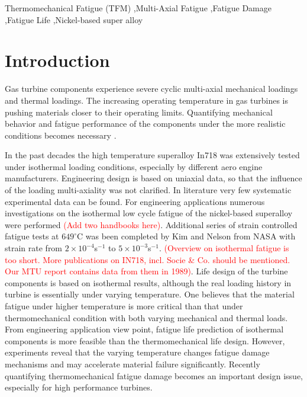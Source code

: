 \documentclass[preprint,5p,twocolumn,11pt,sort&compress]{elsarticle}
\newcommand{\marked}[1]{\textcolor{red}{#1}}
\begin{document}
\begin{frontmatter}
%
\begin{keyword}
Thermomechanical Fatigue (TFM) \sep Multi-Axial Fatigue \sep Fatigue Damage \sep Fatigue Life \sep Nickel-based super alloy

\end{keyword}
\end{frontmatter}

\section{Introduction}
Gas turbine components experience severe cyclic multi-axial mechanical loadings and thermal loadings. The increasing operating temperature in gas turbines is pushing materials closer to their operating limits. Quantifying mechanical behavior and fatigue performance of the components under the more realistic conditions becomes necessary \cite{Harrison1996}.

In the past decades the high temperature superalloy In718 was extensively tested under isothermal loading conditions, especially by different aero engine manufacturers. Engineering design is based on uniaxial data, so that the influence of the loading multi-axiality was not clarified. In literature very few systematic experimental data can be found. For engineering applications numerous investigations on the isothermal low cycle fatigue of the nickel-based superalloy were performed \cite{Mahobia2014, Chen2016, William1995}\marked{(Add two handbooks here)}. Additional series of strain controlled fatigue tests at $649^\circ$C was been completed by Kim \cite{kim1988elevated} and Nelson \cite{nelson1992creep} from NASA with strain rate from $2\times10^{-4}$s$^{-1}$ to $5\times10^{-3}$s$^{-1}$.
 \marked{(Overview on isothermal fatigue is too short. More publications on IN718, incl. Socie \& Co. should be mentioned. Our MTU report contains data from them in 1989)}. Life design of the turbine components is based on isothermal results, although the real loading history in turbine is essentially under varying temperature. One believes that the material fatigue under higher temperature is more critical than that under thermomechanical condition with both varying mechanical and thermal loads. From engineering application view point, fatigue life prediction of isothermal components is more feasible than the thermomechanical life design. However, experiments reveal that the varying temperature changes fatigue damage mechanisms and may accelerate material failure significantly. Recently quantifying thermomechanical fatigue damage becomes an important design issue, especially for high performance turbines.
\end{document}
